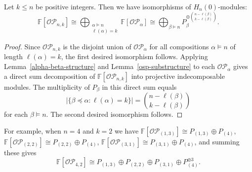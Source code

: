 \documentclass[ALCO,ThmDefs,published]{cedram}
\newcommand{\FF}{{\mathbb{F}}}
\theoremstyle{plain}
\newcommand{\OP}{{\mathcal{OP}}}
\newcommand{\FF}{{\mathbb{F}}}
\begin{document}
\begin{proposition}
\label{osp-structure}
Let $k \leq n$ be positive integers. 
Then we have isomorphisms of $H_n(0)$-modules:
\begin{equation}
\FF[\OP_{n,k}] \cong \bigoplus_{\substack{ \alpha\models n \\ \ell(\alpha)=k }} \FF[\OP_\alpha] \cong \bigoplus_{\beta \models n} P_{\beta}^{\oplus{n - \ell(\beta) \choose k - \ell(\beta)}}.
\end{equation}
\end{proposition}

\begin{proof}
Since $\OP
_{n,k}$ is the disjoint union of $\OP_{\alpha}$ for all compositions $\alpha\models n$ of length $\ell(\alpha)=k$, the first desired isomorphism follows.
Applying Lemma~\ref{alpha-beta-structure} and Lemma~\ref{osp-substructure} to each $\OP_{\alpha}$ gives a direct sum decomposition of $\FF[\OP_{n,k}]$ into projective indecomposable modules.
The multiplicity of $P_\beta$ in this direct sum equals 
\[ |\{\beta\preceq\alpha: \ell(\alpha)=k\}| = { n-\ell(\beta) \choose k-\ell(\beta) }\]
for each $\beta\models n$. 
The second desired isomorphism follows.
\end{proof}

For example, when $n = 4$ and $k = 2$ 
we have $\FF[\OP_{(1,3)}] \cong P_{(1,3)} \oplus P_{(4)}$, $\FF[\OP_{(2,2)}]\cong P_{(2,2)} \oplus P_{(4)}$, 
$\FF[\OP_{(3,1)}] \cong P_{(3,1)}\oplus P_{(4)}$, and summing these gives
\begin{equation}
 \FF[\OP_{4,2}] \cong P_{(1,3)}\oplus P_{(2,2)} \oplus P_{(3,1)} \oplus P_{(4)}^{\oplus 3}.
\end{equation}
\end{document}
